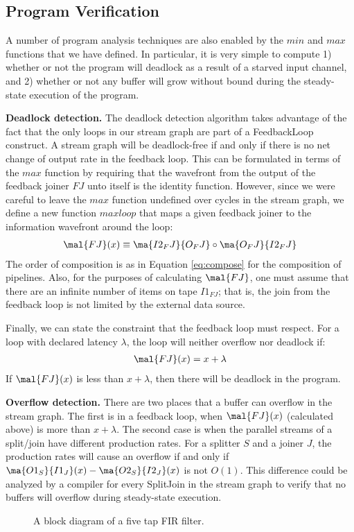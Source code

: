 \subsection{Program Verification}

A number of program analysis techniques are also enabled by the $min$
and $max$ functions that we have defined.  In particular, it is very
simple to compute 1) whether or not the program will deadlock as a
result of a starved input channel, and 2) whether or not any buffer
will grow without bound during the steady-state execution of the
program.

{\bf Deadlock detection.}  The deadlock detection algorithm takes
advantage of the fact that the only loops in our stream graph are part
of a FeedbackLoop construct.  A stream graph will be deadlock-free if
and only if there is no net change of output rate in the feedback
loop.  This can be formulated in terms of the $max$ function by
requiring that the wavefront from the output of the feedback joiner
$FJ$ unto itself is the identity function.  However, since we were
careful to leave the $max$ function undefined over cycles in the
stream graph, we define a new function $maxloop$ that maps a given
feedback joiner to the information wavefront around the loop:
\begin{align*}
\mal{FJ}(x) \equiv \ma{I2_FJ}{O_FJ} \circ \ma{O_FJ}{I2_FJ}
\end{align*}
The order of composition is as in Equation \ref{eq:compose} for the
composition of pipelines. Also, for the purposes of calculating
$\mal{FJ}$, one must assume that there are an infinite number of items
on tape $I1_{FJ}$; that is, the join from the feedback loop is not
limited by the external data source.

Finally, we can state the constraint that the feedback loop must
respect.  For a loop with declared latency $\lambda$, the loop will neither
overflow nor deadlock if:
\begin{align*}
\mal{FJ}(x) = x + \lambda
\end{align*}
If $\mal{FJ}(x)$ is less than $x + \lambda$, then there will be deadlock in
the program.

{\bf Overflow detection.}  There are two places that a buffer can
overflow in the stream graph.  The first is in a feedback loop, when
$\mal{FJ}(x)$ (calculated above) is more than $x + \lambda$.  The second
case is when the parallel streams of a split/join have different
production rates.  For a splitter $S$ and a joiner $J$, the production
rates will cause an overflow if and only if $\ma{O1_S}{I1_J}(x) -
\ma{O2_S}{I2_J}(x)$ is not $O(1)$.  This difference could be analyzed
by a compiler for every SplitJoin in the stream graph to verify that
no buffers will overflow during steady-state execution.

\begin{figure}[t]
\centering
{}
\caption{A block diagram of a five tap FIR filter.}
\label{fig:firfilter}
\end{figure}



